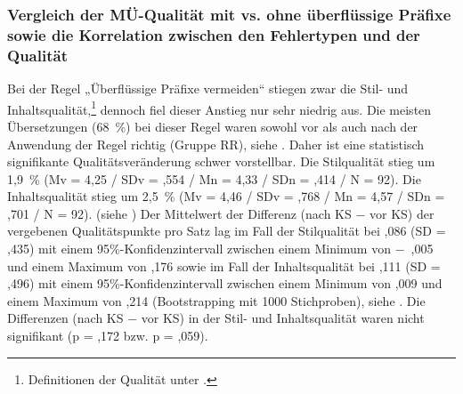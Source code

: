 \subsubsection{\label{sec:5.3.8.4}Vergleich der MÜ-Qualität mit vs. ohne überflüssige Präfixe sowie die Korrelation zwischen den Fehlertypen und der Qualität}

Bei der Regel „Überflüssige Präfixe vermeiden“ stiegen zwar die Stil- und Inhaltsqualität,\footnote{\textrm{Definitionen der Qualität unter .}} dennoch fiel dieser Anstieg nur sehr niedrig aus. Die meisten Übersetzungen (68~\%) bei dieser Regel waren sowohl vor als auch nach der Anwendung der Regel richtig (Gruppe RR), siehe . Daher ist eine statistisch signifikante Qualitätsveränderung schwer vorstellbar. Die Stilqualität stieg um 1,9~\% (Mv = 4,25 / SDv = ,554 / Mn = 4,33 / SDn = ,414 / N = 92). Die Inhaltsqualität stieg um 2,5~\% (Mv = 4,46 / SDv = ,768 / Mn = 4,57 / SDn = ,701 / N = 92). (siehe ) Der Mittelwert der Differenz (nach KS $-$ vor KS) der vergebenen Qualitätspunkte pro Satz lag im Fall der Stilqualität bei ,086 (SD = ,435) mit einem 95\%\nobreakdash-Konfidenzintervall zwischen einem Minimum von $-$~,005 und einem Maximum von ,176 sowie im Fall der Inhaltsqualität bei ,111 (SD = ,496) mit einem 95\%\nobreakdash-Konfidenzintervall zwischen einem Minimum von ,009 und einem Maximum von ,214 (Bootstrapping mit 1000 Stichproben), siehe . Die Differenzen (nach KS $-$ vor KS) in der Stil- und Inhaltsqualität waren nicht signifikant (p = ,172 bzw. p = ,059).


